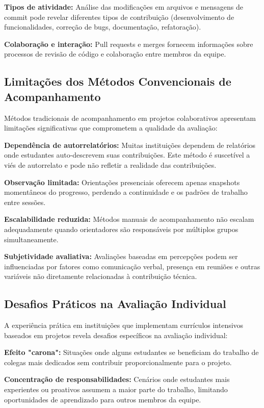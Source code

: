 \documentclass[english, spanish, brazilian]{RBIEarticle} %
\begin{document}
\textbf{Tipos de atividade:} Análise das modificações em arquivos e mensagens de commit pode revelar diferentes tipos de contribuição (desenvolvimento de funcionalidades, correção de bugs, documentação, refatoração).

\textbf{Colaboração e interação:} Pull requests e merges fornecem informações sobre processos de revisão de código e colaboração entre membros da equipe.

\subsection{Limitações dos Métodos Convencionais de Acompanhamento}

Métodos tradicionais de acompanhamento em projetos colaborativos apresentam limitações significativas que comprometem a qualidade da avaliação:

\textbf{Dependência de autorrelatórios:} Muitas instituições dependem de relatórios onde estudantes auto-descrevem suas contribuições. Este método é suscetível a viés de autorrelato e pode não refletir a realidade das contribuições.

\textbf{Observação limitada:} Orientações presenciais oferecem apenas snapshots momentâneos do progresso, perdendo a continuidade e os padrões de trabalho entre sessões.

\textbf{Escalabilidade reduzida:} Métodos manuais de acompanhamento não escalam adequadamente quando orientadores são responsáveis por múltiplos grupos simultaneamente.

\textbf{Subjetividade avaliativa:} Avaliações baseadas em percepções podem ser influenciadas por fatores como comunicação verbal, presença em reuniões e outras variáveis não diretamente relacionadas à contribuição técnica.

\subsection{Desafios Práticos na Avaliação Individual}

A experiência prática em instituições que implementam currículos intensivos baseados em projetos revela desafios específicos na avaliação individual:

\textbf{Efeito "carona":} Situações onde alguns estudantes se beneficiam do trabalho de colegas mais dedicados sem contribuir proporcionalmente para o projeto.

\textbf{Concentração de responsabilidades:} Cenários onde estudantes mais experientes ou proativos assumem a maior parte do trabalho, limitando oportunidades de aprendizado para outros membros da equipe.
\end{document}
